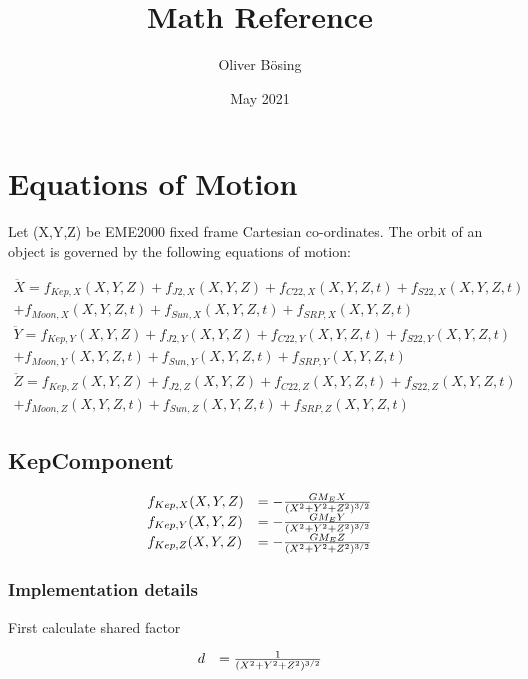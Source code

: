 \documentclass{article}
\title{Math Reference}
\author{Oliver Bösing}
\date{May 2021}
\begin{document}
\maketitle

\section{Equations of Motion}

Let (X,Y,Z) be EME2000 fixed frame Cartesian co-ordinates. The orbit of an object is governed by the following equations of motion:

\begin{equation}
\begin{array}{ll}
     \ddot{X} = f_{Kep,X}(X,Y,Z)+f_{J2,X}(X,Y,Z)+f_{C22,X}(X,Y,Z,t)+f_{S22,X}(X,Y,Z,t)\\
    +f_{Moon,X}(X,Y,Z,t)+f_{Sun,X}(X,Y,Z,t)+f_{SRP,X}(X,Y,Z,t) \\
    \ddot{Y} = f_{Kep,Y}(X,Y,Z)+f_{J2,Y}(X,Y,Z)+f_{C22,Y}(X,Y,Z,t)+f_{S22,Y}(X,Y,Z,t)\\
    +f_{Moon,Y}(X,Y,Z,t)+f_{Sun,Y}(X,Y,Z,t)+f_{SRP,Y}(X,Y,Z,t) \\
    \ddot{Z} = f_{Kep,Z}(X,Y,Z)+f_{J2,Z}(X,Y,Z)+f_{C22,Z}(X,Y,Z,t)+f_{S22,Z}(X,Y,Z,t)\\
    +f_{Moon,Z}(X,Y,Z,t)+f_{Sun,Z}(X,Y,Z,t)+f_{SRP,Z}(X,Y,Z,t)
\end{array}
\end{equation}

\subsection{KepComponent}

\begin{equation}
\begin{array}{ll}
f_{Kep,X}(X,Y,Z) &= -{GM_E X\over (X^2+Y^2+Z^2)^{3/2}}\\
f_{Kep,Y}(X,Y,Z) &= -{GM_E Y\over (X^2+Y^2+Z^2)^{3/2}}\\
f_{Kep,Z}(X,Y,Z) &= -{GM_E Z\over (X^2+Y^2+Z^2)^{3/2}}
\end{array}
\end{equation}

\subsubsection{Implementation details}

First calculate shared factor

\begin{equation}
\begin{array}{ll}
d &= {1\over (X^2+Y^2+Z^2)^{3/2}}
\end{array}
\end{equation}
\end{document}

